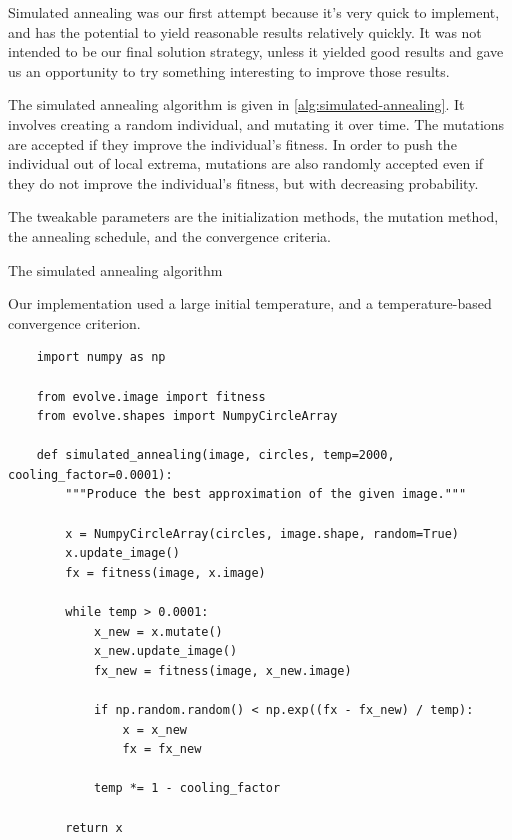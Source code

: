 \documentclass{article}
\begin{document}
Simulated annealing was our first attempt because it's very quick to implement, and has the potential to yield reasonable results relatively quickly. It was not intended to be our final solution strategy, unless it yielded good results and gave us an opportunity to try something interesting to improve those results.

The simulated annealing algorithm is given in \autoref{alg:simulated-annealing}. It involves creating a random individual, and mutating it over time. The mutations are accepted if they improve the individual's fitness. In order to push the individual out of local extrema, mutations are also randomly accepted even if they do not improve the individual's fitness, but with decreasing probability.

The tweakable parameters are the initialization methods, the mutation method, the annealing schedule, and the convergence criteria.

\begin{algorithm}[H]
    \begin{algorithmic}
                \EndIf{}
            \EndWhile{}
            \State{}
        \EndFunction{}
    \end{algorithmic}
    \caption{The simulated annealing algorithm}\label{alg:simulated-annealing}
\end{algorithm}

Our implementation used a large initial temperature, and a temperature-based convergence criterion.

\begin{verbatim}
    import numpy as np
    
    from evolve.image import fitness
    from evolve.shapes import NumpyCircleArray
    
    def simulated_annealing(image, circles, temp=2000, cooling_factor=0.0001):
        """Produce the best approximation of the given image."""
    
        x = NumpyCircleArray(circles, image.shape, random=True)
        x.update_image()
        fx = fitness(image, x.image)
    
        while temp > 0.0001:
            x_new = x.mutate()
            x_new.update_image()
            fx_new = fitness(image, x_new.image)
    
            if np.random.random() < np.exp((fx - fx_new) / temp):
                x = x_new
                fx = fx_new
    
            temp *= 1 - cooling_factor
    
        return x
\end{verbatim}
\end{document}
